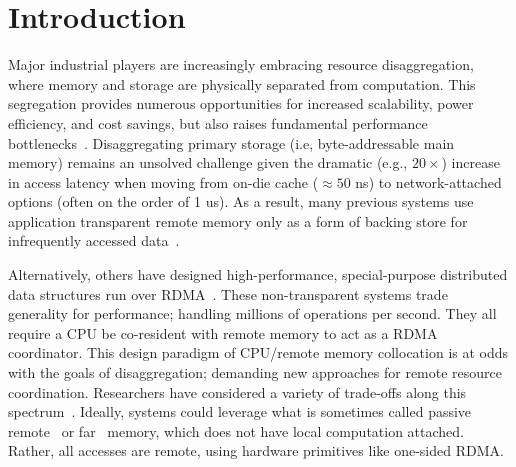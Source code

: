 \section{Introduction}
\label{sec:intro}

Major industrial players are increasingly embracing resource disaggregation,
where memory and storage are physically separated from computation. This
segregation provides numerous opportunities for increased scalability, power
efficiency, and cost savings, but also raises fundamental performance
bottlenecks~\cite{requirements}. Disaggregating primary storage (i.e,
byte-addressable main memory) remains an unsolved challenge given the
dramatic (e.g., $20\times$) increase in access latency when moving from
on-die cache ($\approx 50$ ns) to network-attached options (often on the
order of 1 us). As a result, many previous systems use application
transparent remote memory only as a form of backing store for infrequently
accessed data~\cite{job_throughput,infiniswap,leap,legoos}.


Alternatively, others have designed high-performance, special-purpose
distributed data structures run over
RDMA~\cite{farm,erpc,herd,fasst,pilaf,cell,sonuma,storm}. These
non-transparent systems trade generality for performance; handling millions
of operations per second.
They all require a
CPU be co-resident with remote memory to act as a RDMA coordinator. This
design paradigm of CPU/remote memory collocation is at odds with the goals of
disaggregation; demanding new approaches for remote resource coordination.
Researchers have
considered a variety of trade-offs along this
spectrum~\cite{aguilera2019designing,  disandapp,
amanda-hotnets,beyond,requirements}.  Ideally, systems could leverage what is
sometimes called passive remote~\cite{clover} or
far~\cite{aguilera2019designing} memory, which does not have local
computation attached.  Rather, all accesses are remote, using hardware
primitives like one-sided RDMA.  

